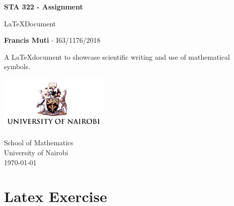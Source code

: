 \documentclass[a4paper]{article}
\begin{document}
\begin{titlepage}
	\begin{center}
		\vspace*{1cm}
		\Huge
		\textbf{STA 322 - Assignment}
		
		\vspace{0.5cm}		
		\LARGE
		\LaTeX \;Document
		\vspace{1.5cm}
		
		\textbf{Francis Muti} \textsc{- I63/1176/2018}
		\vfill
		
		A \LaTeX \;document to showcase scientific writing and
		use of mathematical symbols.
		
		\vspace{0.8cm}
		\includegraphics[width=0.4\textwidth]{uon.jpg}
		
		\Large
		School of Mathematics\\
		University of Nairobi\\
		\today \\
	\end{center}
\end{titlepage}

\section{Latex Exercise}
\label{sec:exercise}
\end{document}
